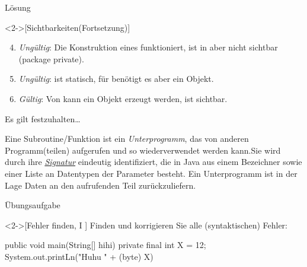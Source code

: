 \begin{frame}[c]{Lösung}
    \addtocounter{solve}{-1}%
    \begin{solve}<2->[Sichtbarkeiten\hfill(Fortsetzung)]
       \begin{enumerate}[<+(1)->]
            \setcounter{enumi}{3}
           \item \emph{Ungültig}: Die Konstruktion eines  funktioniert,  ist in  aber nicht sichtbar (package private).
           \item \emph{Ungültig}:  ist statisch, für  benötigt es aber ein Objekt.
           \item \emph{Gültig}: Von  kann ein Objekt erzeugt werden,  ist  sichtbar.
       \end{enumerate}
    \end{solve}
\end{frame}
\fi

\begin{frame}[c]{Es gilt festzuhalten\ldots}
    \begin{definition}[Subroutinen]
        Eine Subroutine\thinspace /\thinspace Funktion ist ein \emph{Unterprogramm},\pause{} das von anderen Programm(teilen) aufgerufen und so wiederverwendet werden kann.\pause{}\medskip\newline Sie wird durch ihre \hyperlink{mrk:Signatur}{\emph{Signatur}} eindeutig identifiziert,\pause{} die in Java aus einem Bezeichner sowie einer Liste an Datentypen der Parameter besteht. Ein Unterprogramm ist in der Lage Daten an den aufrufenden Teil zurückzuliefern.
    \end{definition}
\end{frame}

\ifull
\begin{frame}[c,fragile]{Übungsaufgabe}
    \begin{exercise}<2->[Fehler finden, I ]
        \pause{}Finden und korrigieren Sie alle (syntaktischen) Fehler:\pause{}
        \begin{plainvoid}
public void main(String[] hihi) {
    private final int X = 12;
    System.out.printLn("Huhu " + (byte) X)
}
        \end{plainvoid}
    \end{exercise}
\end{frame}

